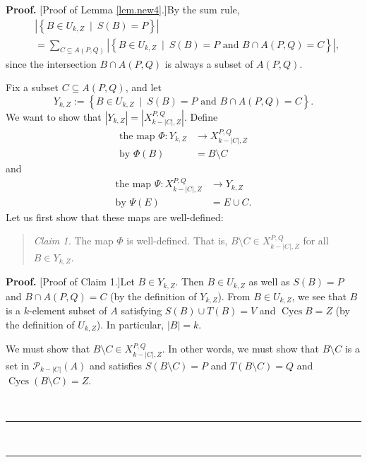 \documentclass[numbers=enddot,12pt,final,onecolumn,notitlepage]{scrartcl}%
\theoremstyle{definition}
\newenvironment{statement}{\begin{quote}}{\end{quote}}
\newenvironment{proof}[1][Proof]{\noindent\textbf{#1.} }{\ \rule{0.5em}{0.5em}}
\let\sumnonlimits\sum
\renewcommand{\sum}{\sumnonlimits\limits}
\theoremstyle{plainsl}
\begin{document}
\begin{proof}
[Proof of Lemma \ref{lem.new4}.]By the sum rule,
\begin{align}
&  \left\vert \left\{  B\in U_{k,Z}\ \mid\ S\left(  B\right)  =P\right\}
\right\vert \nonumber\\
&  =\sum_{C\subseteq A\left(  P,Q\right)  }\left\vert \left\{  B\in
U_{k,Z}\ \mid\ S\left(  B\right)  =P\text{ and }B\cap A\left(  P,Q\right)
=C\right\}  \right\vert , \label{pf.lem.new4.sum}%
\end{align}
since the intersection $B\cap A\left(  P,Q\right)  $ is always a subset of
$A\left(  P,Q\right)  $.

Fix a subset $C\subseteq A(P,Q)$, and let
\[
Y_{k,Z}:=\left\{  B\in U_{k,Z}\ \mid\ S\left(  B\right)  =P\text{ and }B\cap
A\left(  P,Q\right)  =C\right\}  .
\]
We want to show that $\left\vert Y_{k,Z}\right\vert =\left\vert
X_{k-\left\vert C\right\vert ,Z}^{P,Q}\right\vert $. Define
\begin{align*}
\text{the map }\Phi:Y_{k,Z}  &  \rightarrow X_{k-\left\vert C\right\vert
,Z}^{P,Q}\\
\text{by }\Phi(B)  &  =B\setminus C
\end{align*}
and
\begin{align*}
\text{the map }\Psi:X_{k-\left\vert C\right\vert ,Z}^{P,Q}  &  \rightarrow
Y_{k,Z}\\
\text{by }\Psi(E)  &  =E\cup C.
\end{align*}
Let us first show that these maps are well-defined:

\begin{statement}
\textit{Claim 1.} The map $\Phi$ is well-defined. That is, $B\setminus C\in
X_{k-\left\vert C\right\vert ,Z}^{P,Q}$ for all $B\in Y_{k,Z}$.
\end{statement}

\begin{proof}
[Proof of Claim 1.]Let $B\in Y_{k,Z}$. Then $B\in U_{k,Z}$ as well as
$S\left(  B\right)  =P$ and $B\cap A\left(  P,Q\right)  =C$ (by the definition
of $Y_{k,Z}$). From $B\in U_{k,Z}$, we see that $B$ is a $k$-element subset of
$A$ satisfying $S\left(  B\right)  \cup T\left(  B\right)  =V$ and
$\operatorname*{Cycs}B=Z$ (by the definition of $U_{k,Z}$). In particular,
$\left\vert B\right\vert =k$.

We must show that $B\setminus C\in X_{k-\left\vert C\right\vert ,Z}^{P,Q}$. In
other words, we must show that $B\setminus C$ is a set in $\mathcal{P}%
_{k-\left\vert C\right\vert }\left(  A\right)  $ and satisfies $S\left(
B\setminus C\right)  =P$ and $T\left(  B\setminus C\right)  =Q$ and
$\operatorname*{Cycs}\left(  B\setminus C\right)  =Z$.


\end{proof}
\end{proof}
\end{document}
